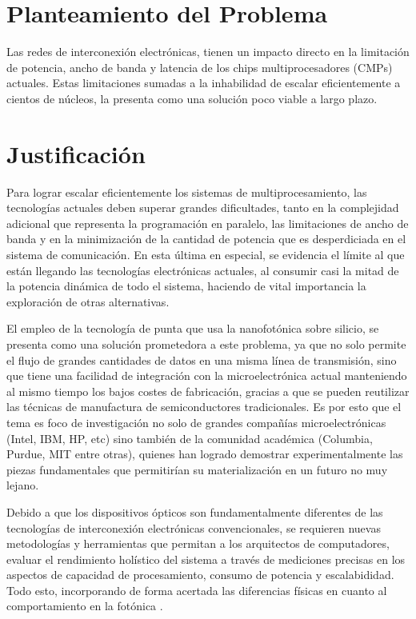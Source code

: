 \section{Planteamiento del Problema}
Las redes de interconexión electrónicas, tienen un impacto directo en 
la limitación de potencia, ancho de banda y latencia de los
chips multiprocesadores (CMPs) actuales. 
Estas limitaciones sumadas a la inhabilidad de escalar eficientemente a cientos de
núcleos, la presenta como una solución poco viable a largo plazo.


\section{Justificación}
Para lograr escalar eficientemente los sistemas de multiprocesamiento, las tecnologías 
actuales deben superar grandes dificultades, tanto en la complejidad adicional 
que representa la programación en paralelo, las limitaciones de ancho de banda y en la
minimización de la cantidad de potencia que es desperdiciada en el sistema de comunicación. 
En esta última en especial, se evidencia el límite al que están llegando las 
tecnologías electrónicas actuales, al consumir casi la mitad \cite{Magen2004} de la 
potencia dinámica de todo el sistema, haciendo de vital importancia la 
exploración de otras alternativas.

El empleo de la tecnología de punta que usa la nanofotónica sobre silicio, 
se presenta como una solución prometedora a este
problema, ya que no solo permite el flujo de grandes cantidades de 
datos en una misma línea de transmisión, sino que tiene una facilidad de 
integración con la microelectrónica actual manteniendo al mismo tiempo los 
bajos costes de fabricación, gracias a que se pueden reutilizar las técnicas 
de manufactura de semiconductores tradicionales. Es por esto que el tema es foco de
investigación no solo de grandes compañías microelectrónicas (Intel, IBM, HP, etc) 
sino también de la comunidad académica (Columbia, Purdue, MIT entre otras), 
quienes han logrado demostrar experimentalmente las piezas fundamentales que 
permitirían su materialización en un futuro no muy lejano.

Debido a que los dispositivos ópticos son fundamentalmente diferentes de 
las tecnologías de interconexión electrónicas convencionales, se requieren nuevas 
metodologías y herramientas que permitan a 
los arquitectos de computadores, evaluar el rendimiento holístico del sistema a 
través de mediciones precisas en los aspectos de capacidad de procesamiento, 
consumo de potencia y escalabididad.
Todo esto, incorporando de forma acertada las diferencias físicas 
en cuanto al comportamiento en la fotónica \cite{Chan2010}.

